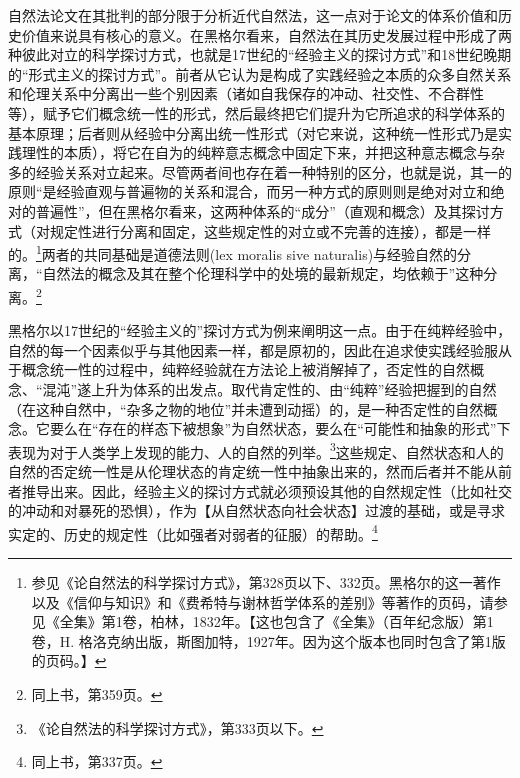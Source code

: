 自然法论文在其批判的部分限于分析近代自然法，这一点对于论文的体系价值和历史价值来说具有核心的意义。在黑格尔看来，自然法在其历史发展过程中形成了两种彼此对立的科学探讨方式，也就是17世纪的“经验主义的探讨方式”和18世纪晚期的“形式主义的探讨方式”。前者从它认为是构成了实践经验之本质的众多自然关系和伦理关系中分离出一些个别因素（诸如自我保存的冲动、社交性、不合群性等），赋予它们概念统一性的形式，然后最终把它们提升为它所追求的科学体系的基本原理；后者则从经验中分离出统一性形式（对它来说，这种统一性形式乃是实践理性的本质），将它在自为的纯粹意志概念中固定下来，并把这种意志概念与杂多的经验关系对立起来。尽管两者间也存在着一种特别的区分，也就是说，其一的原则“是经验直观与普遍物的关系和混合，而另一种方式的原则则是绝对对立和绝对的普遍性”，但在黑格尔看来，这两种体系的“成分”（直观和概念）及其探讨方式（对规定性进行分离和固定，这些规定性的对立或不完善的连接），都是一样的。\footnote{参见《论自然法的科学探讨方式》，第328页以下、332页。黑格尔的这一著作以及《信仰与知识》和《费希特与谢林哲学体系的差别》等著作的页码，请参见《全集》第1卷，柏林，1832年。【这也包含了《全集》（百年纪念版）第1卷，H. 格洛克纳出版，斯图加特，1927年。因为这个版本也同时包含了第1版的页码。】}两者的共同基础是道德法则(lex moralis sive naturalis)与经验自然的分离，“自然法的概念及其在整个伦理科学中的处境的最新规定，均依赖于”这种分离。\footnote{同上书，第359页。}

黑格尔以17世纪的“经验主义的”探讨方式为例来阐明这一点。由于在纯粹经验中，自然的每一个因素似乎与其他因素一样，都是原初的，因此在追求使实践经验服从于概念统一性的过程中，纯粹经验就在方法论上被消解掉了，否定性的自然概念、“混沌”遂上升为体系的出发点。取代肯定性的、由“纯粹”经验把握到的自然（在这种自然中，“杂多之物的地位”并未遭到动摇）的，是一种否定性的自然概念。它要么在“存在的样态下被想象”为自然状态，要么在“可能性和抽象的形式”下表现为对于人类学上发现的能力、人的自然的列举。\footnote{《论自然法的科学探讨方式》，第333页以下。}这些规定、自然状态和人的自然的否定统一性是从伦理状态的肯定统一性中抽象出来的，然而后者并不能从前者推导出来。因此，经验主义的探讨方式就必须预设其他的自然规定性（比如社交的冲动和对暴死的恐惧），作为【从自然状态向社会状态】过渡的基础，或是寻求实定的、历史的规定性（比如强者对弱者的征服）的帮助。\footnote{同上书，第337页。}

